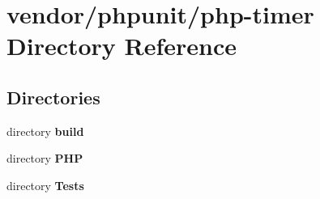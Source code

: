 \section{vendor/phpunit/php-\/timer Directory Reference}
\label{dir_5d0c78d029a80ab0b63def0d3e091c82}
\subsection*{Directories}
\begin{DoxyCompactItemize}
\item 
directory {\bf build}
\item 
directory {\bf P\+H\+P}
\item 
directory {\bf Tests}
\end{DoxyCompactItemize}
